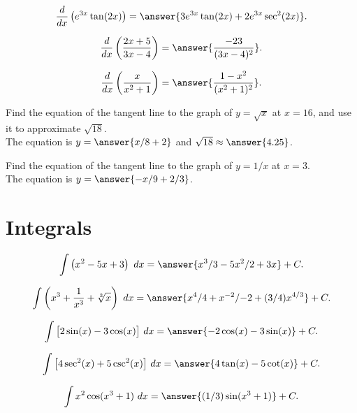 \documentclass{ximera}
\begin{document}
\begin{problem}
\[\frac{d}{dx}\left(e^{3x} \tan(2x)\right) = \answer{3e^{3x} \tan(2x) + 2e^{3x}\sec^2(2x)}.\]
\end{problem}

\begin{problem}
\[\frac{d}{dx}\left(\frac{2x+5}{3x - 4}\right) = \answer{\frac{-23}{(3x-4)^2}}.\]

\[\frac{d}{dx}\left(\frac{x}{x^2 + 1}\right) = \answer{\frac{1 - x^2}{(x^2 + 1)^2}}.\]
\end{problem}

\begin{problem}
Find the equation of the tangent line to the graph of $y=\sqrt{x}$ at $x = 16$, and use it to approximate $\sqrt{18}$.\\
The equation is $y = \answer{x/8 + 2}$ and $\sqrt{18} \approx \answer{4.25}$.


\end{problem}

\begin{problem}
Find the equation of the tangent line to the graph of $y=1/x$ at $x = 3$.\\
The equation is $y = \answer{-x/9 +2/3}$.
\end{problem}


\section{Integrals}

\begin{problem}
\[\int\left(x^2 - 5x + 3  \right) \ dx = \answer{x^3/3 - 5x^2 /2 + 3x} + C.\]
\end{problem}

\begin{problem}
\[\int\left(x^3 + \frac{1}{x^3} + \sqrt[3]x  \right) \ dx = \answer{x^4/4 +x^{-2}/{-2} + 
(3/4)x^{4/3}} + C.\]
\end{problem}

\begin{problem}
\[\int\big[2\sin(x) - 3\cos(x)  \big] \ dx = \answer{-2\cos(x) -3\sin(x)} + C.\]
\end{problem}

\begin{problem}
\[\int\big[4\sec^2(x) + 5 \csc^2(x) \big] \ dx = \answer{4\tan(x) - 5 \cot(x)} + C.\]
\end{problem}

\begin{problem}
\[\int x^2 \cos(x^3 + 1) \ dx = \answer{(1/3) \sin(x^3 +1)} + C.\]
\end{problem}
\end{document}
